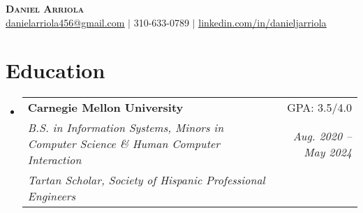\documentclass[letterpaper,11pt]{article}
\makeatletter
\newcommand{\resumeEducationSubheading}[6]{
  \vspace{-2pt}\item
    \begin{tabular*}{0.97\textwidth}[t]{l@{\extracolsep{\fill}}r}
      \textbf{#1} & #2 \\
      \textit{\small#3} & \textit{\small #4} \\
      \textit{\small#5} & \textit{\small #6} \\
    \end{tabular*}\vspace{-7pt}
}
\newcommand{\resumeSubHeadingListStart}{\begin{itemize}[leftmargin=0.15in, label={}]}
\newcommand{\resumeSubHeadingListEnd}{\end{itemize}}
\makeatother
\begin{document}

\begin{center}
    \textbf{\Huge \scshape Daniel Arriola} \\ \vspace{1pt}
    \href{mailto:danielarriola456@gmail.com}{\underline{danielarriola456@gmail.com}} $|$ 
    \small 310-633-0789 $|$
    \href{https://www.linkedin.com/in/danieljarriola}{\underline{linkedin.com/in/danieljarriola}}
\end{center}


\section{Education}
    \resumeSubHeadingListStart
        \resumeEducationSubheading
        {Carnegie Mellon University}{GPA: 3.5/4.0}
        {B.S. in Information Systems, Minors in Computer Science \& Human Computer Interaction}{Aug. 2020 -- May 2024}
        {Tartan Scholar, Society of Hispanic Professional Engineers}{}
    \resumeSubHeadingListEnd


\end{document}
